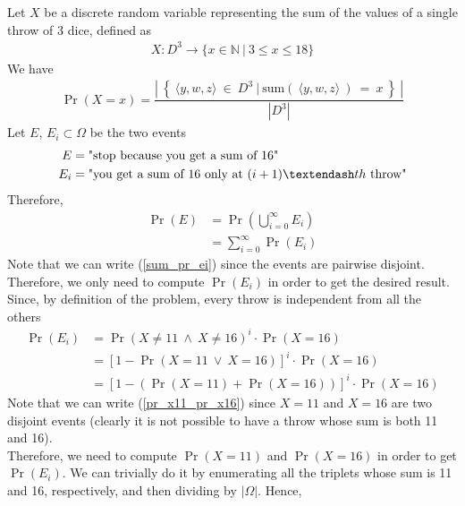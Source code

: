 Let $X$ be a discrete random variable representing the sum of the values of a single throw of 3 dice, defined as
\begin{align*}
	X: D^3 \rightarrow \{ x \in \mathbb{N} \ | \ 3 \leq x \leq 18 \}
\end{align*}
We have
\begin{align}
	\Pr(X = x) = \dfrac{\left | \ \left \{ \ \langle y,w,z \rangle \ \in \ D^3 \ \big| \ \mathrm{sum}(\ \langle y,w,z \rangle \ ) \ = \ x \ \right \} \ \right |}{\left | D^3 \right |} \label{triplet}
\end{align}
Let $E$, $E_i \subset \Omega$ be the two events
\begin{align*}
	E &= \text{"stop because you get a sum of 16"}\\
	E_i &= \text{"you get a sum of 16 only at $(i+1) \textendash th$ throw"}
\end{align*}
Therefore,
\begin{align}
	\Pr(E) &= \Pr\left(\bigcup_{i = 0}^{\infty} E_i \right) \nonumber\\
	&= \sum_{i = 0}^{\infty}\Pr(E_i) \label{sum_pr_ei}
\end{align}
Note that we can write (\ref{sum_pr_ei}) since the events are pairwise disjoint.\\
Therefore, we only need to compute $\Pr(E_i)$ in order to get the desired result. Since, by definition of the problem, every throw is independent from all the others
\begin{align}
	\Pr(E_i) &= \Pr( X \ne 11 \ \land \ X \ne 16 )^i \cdot \Pr(X = 16) \nonumber\\
	&= [1 - \Pr( X = 11 \ \lor \ X = 16)]^i \cdot \Pr(X = 16) \nonumber\\
	&= [1 - (\Pr(X = 11) + \Pr( X = 16))]^i \cdot \Pr(X = 16) \label{pr_x11_pr_x16}
\end{align}
Note that we can write (\ref{pr_x11_pr_x16}) since $X = 11$ and $X = 16$ are two disjoint events (clearly it is not possible to have a throw whose sum is both 11 and 16).\\
Therefore, we need to compute $\Pr(X = 11)$ and $\Pr( X = 16)$ in order to get $\Pr(E_i)$. We can trivially do it by enumerating all the triplets whose sum is 11 and 16, respectively, and then dividing by $|\Omega|$. Hence,

